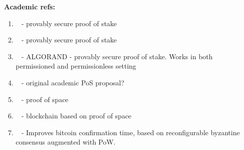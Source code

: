 \noindent
\textbf{Academic refs:}
\begin{enumerate}
\item ~\cite{CRYPTO:KRDO17} - provably secure proof of stake
\item ~\cite{eprint:BenPasShi16} - provably secure proof of stake
\item ~\cite{SOSP:GHMVZ17} - ALGORAND - provably secure proof of stake.  Works in both permissioned and permissionless setting
\item ~\cite{FC:BenGabMiz16} - original academic PoS proposal?
\item ~\cite{CRYPTO:DFKP15} - proof of space
\item ~\cite{eprint:PPKAFG15} - blockchain based on proof of space
\item ~\cite{OPODIS:AMNRS17} - Improves bitcoin confirmation time, based on reconfigurable byzantine consensus augmented with PoW.

\end{enumerate}


